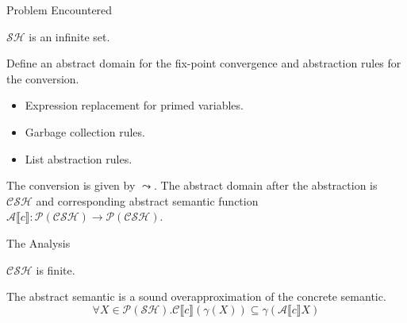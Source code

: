 \documentclass[aspectratio=1610, 13pt]{beamer}
\begin{document}
\fi
\begin{frame}{Problem Encountered}
    \Large
    \begin{center}
    $\mathcal{SH}$ is an infinite set.
    
    \end{center}
    \small
    
    Define an abstract domain for the fix-point convergence and abstraction rules for the conversion.
    \begin{itemize}
        \item Expression replacement for primed variables.
        \item Garbage collection rules.
        \item List abstraction rules.
    \end{itemize}
    The conversion is given by $\leadsto$. The abstract domain after the abstraction is $\mathcal{CSH}$ and corresponding abstract semantic function $\mathcal{A}\llbracket c\rrbracket: \mathcal{P(CSH) \rightarrow P(CSH)}$.
\end{frame}

\begin{frame}{The Analysis}
    \begin{theorem}
    $\mathcal{CSH}$ is finite.
    \end{theorem}
    \begin{theorem}
    The abstract semantic is a sound overapproximation of the concrete semantic.\[\forall X\in \mathcal{P(SH)}. \mathcal{C}\llbracket c\rrbracket(\gamma(X)) \subseteq \gamma(\mathcal{A}\llbracket c\rrbracket X)\]
    \end{theorem}
    
\end{frame}
\end{document}
